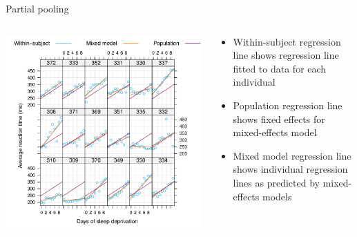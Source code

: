 \documentclass[aspectratio=169]{beamer}
\begin{document}

\begin{frame}{Partial pooling}
  \begin{columns}
    \begin{column}{.5\textwidth}
      \includegraphics[scale=.5]{fig/sleep_shrinkfit}
    \end{column}
    \begin{column}{.5\textwidth}
      \begin{itemize}
        \item Within-subject regression line shows regression line fitted to
          data for each individual
        \item Population regression line shows fixed effects for mixed-effects
          model
        \item Mixed model regression line shows individual regression lines as
          predicted by mixed-effects models
      \end{itemize}
    \end{column}
  \end{columns}
\end{frame}
\end{document}

